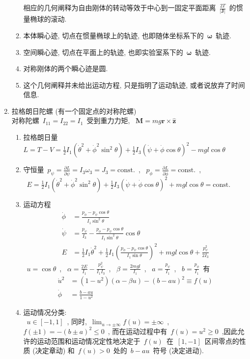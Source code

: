\documentclass[11pt,a4paper]{article}%
\renewcommand{\[}{~$\displaystyle}
\renewcommand{\]}{$~}%
\begin{document}
\begin{enumerate}
\begin{enumerate}
	  相应的几何阐释为自由刚体的转动等效于中心到一固定平面距离\[\frac{2T}{|\bm J|}\]的惯量椭球的滚动.
	  \item 本体瞬心迹, 切点在惯量椭球上的轨迹, 也即随体坐标系下的\[\bm \omega\]轨迹. 
	  \item 空间瞬心迹, 切点在平面上的轨迹, 也即实验室系下的\[\bm \omega\]轨迹. 
	  \item 对称刚体的两个瞬心迹是圆.
	  \item 这个几何阐释并未给出运动方程, 只是指明了运动轨迹, 或者说放弃了时间信息. 
	 \end{enumerate}
	 \item 拉格朗日陀螺 (有一个固定点的对称陀螺)\\
	 对称陀螺\[I_{11} = I_{22} = I_1\]受到重力力矩, \[\bm M = mg \bm r \times \hat{\bm z}\]
	 \begin{enumerate}
	  \item 拉格朗日量\[L = T-V =\frac{1}{2}I_1(\dot \theta^2 + \dot\phi^2\sin^2\theta) + \frac 12I_3(\dot\psi+\dot\phi\cos\theta)^2 - mgl\cos\theta\]
	  \item 守恒量\[p_\psi =\frac{\partial L}{\partial \dot\psi} =  I_3\omega_3 = J_3 = \mbox{const.}\], \[p_\phi =\frac{\partial L}{\partial \dot\phi}= \mbox{const.}\], \\
	  \[E = \frac{1}{2}I_1(\dot \theta^2 + \dot\phi^2\sin^2\theta) + \frac 12I_3(\dot\psi+\dot\phi\cos\theta)^2 + mgl\cos\theta = \mbox{const.}\]
	  \item 运动方程
	   \begin{align*}
	    \dot\phi &= \frac{p_\phi - p_\psi\cos\theta}{I_1\sin^2\theta} \\
	    \dot\psi &= \frac{p_\psi}{I_3} - \frac{p_\phi - p_\psi\cos\theta}{I_1\sin^2\theta}\cos\theta \\
	    E &= \frac 12 I_1\dot\theta^2 + \frac 12 I_1 \left( \frac{p_\phi - p_\psi\cos\theta}{I_1\sin\theta} \right)^2 + mgl\cos\theta + \frac{p_\psi^2}{2I_3}
	   \end{align*}
	   \[u = \cos\theta\], \[\alpha = \frac{2E}{I_1} - \frac{p_\psi^2}{I_1I_3}\], \[\beta = \frac{2mgl}{I_1}\], \[a = \frac{p_\psi}{I_1}\], \[b = \frac{p_\phi}{I_1}\]有
	   \begin{align*}
	   \dot u^2 &= (1-u^2)(\alpha - \beta u) - (b-au)^2 \equiv f(u) \\
	   \dot\phi &= \frac{b - au}{1-u^2}
	   \end{align*}
	 \item 运动情况分类: \\
	 \[u\in [-1,1]\],  同时,\[\lim_{u\to\pm\infty}f(u) = \pm\infty\], \[f(\pm 1) = -(b\pm a)^2\le 0\], 而在运动过程中有\[f(u) = u^2 \ge 0\],因此允许的运动范围和运动情况定性地决定于\[f(u)\]在\[[1,-1]\]区间零点的性质 (决定章动) 和\[f(u)>0\]处的\[b-au\]符号 (决定进动). 
	 \end{enumerate}
	\end{enumerate}
\end{document}
